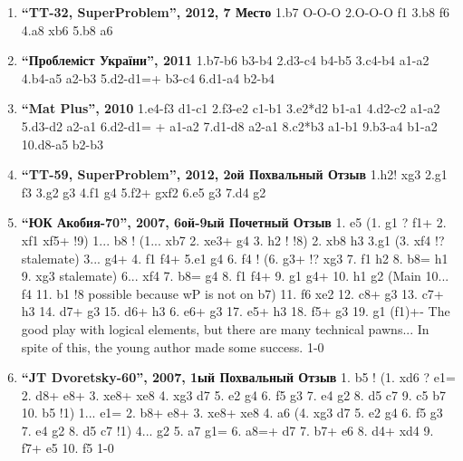 \begin{enumerate}
\item \textbf{ ``TT-32, SuperProblem'', 2012, 7 Место} 1.\knight{}b7 O-O-O 2.O-O-O \rook{}f1 3.\king{}b8 \rook{}f6 4.\king{}a8 \rook{}xb6 5.\rook{}b8 \rook{}a6\mate{}

\item \textbf{ ``Проблеміст України'', 2011 } 1.b7-b6 b3-b4   2.\king{}d3-c4 b4-b5 3.\king{}c4-b4 \king{}a1-a2   4.\king{}b4-a5 \king{}a2-b3 5.d2-d1=\bishop{}+ \king{}b3-c4   6.\bishop{}d1-a4 b2-b4\mate{}

\item \textbf{ ``Mat Plus'', 2010 } 1.\king{}e4-f3 \king{}d1-c1   2.\king{}f3-e2 \king{}c1-b1   3.\king{}e2*d2 \king{}b1-a1   4.\king{}d2-c2 \king{}a1-a2   5.d3-d2 \king{}a2-a1   6.d2-d1=\queen{} + \king{}a1-a2   7.\queen{}d1-d8 \king{}a2-a1   8.\king{}c2*b3 \king{}a1-b1   9.\king{}b3-a4 \king{}b1-a2  10.\queen{}d8-a5 b2-b3 \mate{}

\item \textbf{ ``TT-59, SuperProblem'', 2012, 2ой Похвальный Отзыв } 1.\rook{}h2! \king{}xg3 2.\king{}g1 \king{}f3 3.\rook{}g2 g3 4.\king{}f1 g4 5.\rook{}f2+ gxf2 6.\queen{}e5 g3 7.\queen{}d4 g2\mate{}

\item \textbf{ ``ЮК Акобия-70'', 2007, 6ой-9ый Почетный Отзыв } 1. \queen{}e5 
(1. \king{}g1 ? \rook{}f1+ 2. \king{}xf1 \queen{}xf5+ !9) 
1... \queen{}b8 !
(1... \queen{}xb7 2. \queen{}xe3+ \king{}g4 3. \king{}h2 ! !8) 
2. \queen{}xb8 \king{}h3 3.\king{}g1 
(3. \queen{}xf4 !? {stalemate}) 
3... \rook{}g4+ 4. \king{}f1 \rook{}f4+ 5.\king{}e1 \rook{}g4 6. \queen{}f4 ! 
(6. \queen{}g3+ !? \rook{}xg3 7. \king{}f1 \king{}h2 8. b8=\queen{} \king{}h1 9. \queen{}xg3 { stalemate}) 
6... \rook{}xf4 7. b8=\queen{} \rook{}g4 8. \king{}f1 \rook{}f4+ 9. \king{}g1 \rook{}g4+ 10. \king{}h1 \rook{}g2 
({Main} 10... \rook{}f4 11. \queen{}b1 !8 {possible because wP is not on b7}) 
11. f6 \rook{}xe2 12. \queen{}c8+ \king{}g3 13. \queen{}c7+ \king{}h3 14. \queen{}d7+ \king{}g3 15. \queen{}d6+ \king{}h3 6. \queen{}e6+ \king{}g3 17. \queen{}e5+ \king{}h3 18. \queen{}f5+ \king{}g3 19. \king{}g1 {(\queen{}f1)+- The good play with logical elements, but there are many technical pawns... In spite of this, the young author made some success.} 1-0

\item \textbf{ ``JT Dvoretsky-60'', 2007, 1ый Похвальный Отзыв } 1. \rook{}b5 ! (1. \rook{}xd6 ? e1=\queen{} 2. \rook{}d8+ \queen{}e8+ 3. \rook{}xe8+ \king{}xe8 4. \knight{}xg3 \king{}d7 5. \knight{}e2 g4 6. \king{}f5 g3 7. \king{}e4 g2 8. \king{}d5 \king{}c7 9. \king{}c5 \king{}b7 10. \king{}b5 !1) 1... e1=\queen{} 2. \rook{}b8+ \queen{}e8+ 3. \rook{}xe8+ \king{}xe8 4. a6 (4. \knight{}xg3 \king{}d7 5. \knight{}e2 g4 6. \king{}f5 g3 7. \king{}e4 g2 8. \king{}d5 \king{}c7 !1) 4... g2 5. a7 g1=\queen{} 6. a8=\queen{}+ \king{}d7 7. \queen{}b7+ \king{}e6 8. \knight{}d4+ \queen{}xd4 9. \queen{}f7+ \king{}e5 10. \queen{}f5\mate{} 1-0


\end{enumerate}
